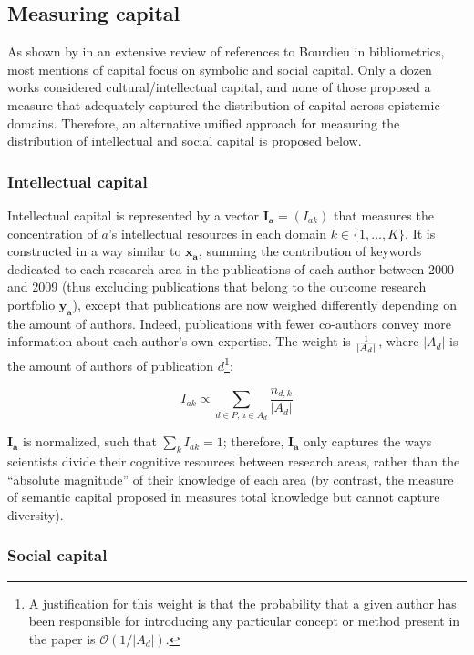 \documentclass{article}
\begin{document}
\subsection{\label{sec:capital}Measuring capital}

As shown by \citet{Schirone2023} in an extensive review of references to Bourdieu in bibliometrics, most mentions of capital focus on symbolic and social capital. Only a dozen works considered cultural/intellectual capital, and none of those proposed a measure that adequately captured the distribution of capital across epistemic domains. Therefore, an alternative unified approach for measuring the distribution of intellectual and social capital is proposed below.

\subsubsection{Intellectual capital}

Intellectual capital is represented by a vector $\bm{I_a}=(I_{ak})$ that measures the concentration of $a$'s intellectual resources in each domain $k \in \{1,\dots,K\}$. It is constructed in a way similar to $\bm{x_{a}}$, summing the contribution of keywords dedicated to each research area in the publications of each author between 2000 and 2009 (thus excluding publications that belong to the outcome research portfolio $\bm{y_a}$), except that publications are now weighed differently depending on the amount of authors. Indeed, publications with fewer co-authors convey more information about each author's own expertise. The weight is $1 \over |A_d|$, where $|A_d|$ is the amount of authors of publication $d$\footnote{A justification for this weight is that the probability that a given author has been responsible for introducing any particular concept or method present in the paper is $\mathcal{O}(1/|A_d|)$. }:

\begin{equation}
    I_{ak} \propto  \sum_{d\in P,a\in A_d} \dfrac{n_{d,k}}{|A_d|}
\end{equation}

$\bm{I_a}$ is normalized, such that $\sum_k I_{ak}=1$; therefore, $\bm{I_a}$ only captures the ways scientists divide their cognitive resources between research areas, rather than the ``absolute magnitude'' of their knowledge of each area (by contrast, the measure of  semantic capital proposed in \citealt{Roth2010} measures total knowledge but cannot capture diversity). 

\subsubsection{Social capital}
\end{document}
